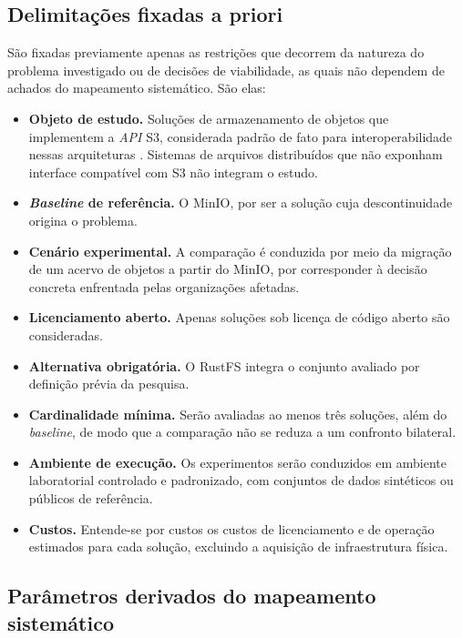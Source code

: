 \subsection{Delimitações fixadas a priori}

São fixadas previamente apenas as restrições que decorrem da natureza do problema
investigado ou de decisões de viabilidade, as quais não dependem de achados do
mapeamento sistemático. São elas:

\begin{itemize}
    \item \textbf{Objeto de estudo.} Soluções de armazenamento de objetos que
          implementem a \textit{API} S3, considerada padrão de fato para
          interoperabilidade nessas arquiteturas \citep{tast2026comparative}.
          Sistemas de arquivos distribuídos que não exponham interface compatível
          com S3 não integram o estudo.
    \item \textbf{\textit{Baseline} de referência.} O MinIO, por ser a solução
          cuja descontinuidade origina o problema.
    \item \textbf{Cenário experimental.} A comparação é conduzida por meio da
          migração de um acervo de objetos a partir do MinIO, por corresponder à
          decisão concreta enfrentada pelas organizações afetadas.
    \item \textbf{Licenciamento aberto.} Apenas soluções sob licença de código
          aberto são consideradas.
    \item \textbf{Alternativa obrigatória.} O RustFS integra o conjunto avaliado
          por definição prévia da pesquisa.
    \item \textbf{Cardinalidade mínima.} Serão avaliadas ao menos três soluções,
          além do \textit{baseline}, de modo que a comparação não se reduza a um
          confronto bilateral.
    \item \textbf{Ambiente de execução.} Os experimentos serão conduzidos em
          ambiente laboratorial controlado e padronizado, com conjuntos de dados
          sintéticos ou públicos de referência.
    \item \textbf{Custos.} Entende-se por custos os custos de licenciamento e de
          operação estimados para cada solução, excluindo a aquisição de
          infraestrutura física.
\end{itemize}

\subsection{Parâmetros derivados do mapeamento sistemático}

